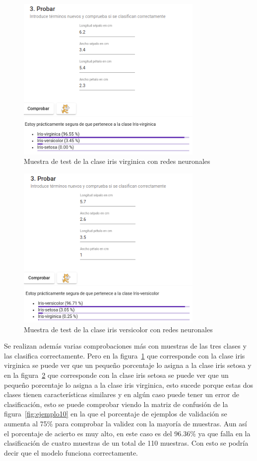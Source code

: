 \documentclass[a4paper, 12pt]{book}
\begin{document}
\begin{figure}
	\centering
	\includegraphics[width=9cm, keepaspectratio]{img/iris_vir_num_rn.png}
	\caption{Muestra de test de la clase iris virginica con redes neuronales} 	\label{fig:ejemplo8}
\end{figure}

\begin{figure}
	\centering
	\includegraphics[width=9cm, keepaspectratio]{img/iris_ver_num_rn.png}
	\caption{Muestra de test de la clase iris versicolor con redes neuronales} 	\label{fig:ejemplo9}
\end{figure}

Se realizan además varias comprobaciones más con muestras de las tres clases y las clasifica correctamente. Pero en la figura~\ref{fig:ejemplo8} que corresponde con la clase iris virginica se puede ver que un pequeño porcentaje lo asigna a la clase iris setosa y en la figura~\ref{fig:ejemplo9} que corresponde con la clase iris setosa se puede ver que un pequeño porcentaje lo asigna a la clase iris virginica, esto sucede porque estas dos clases tienen características similares y en algún caso puede tener un error de clasificación, esto se puede comprobar viendo la matriz de confusión de la figura~\ref{fig:ejemplo10} en la que el porcentaje de ejemplos de validación se aumenta al 75\% para comprobar la validez con la mayoría de muestras. 
Aun así el porcentaje de acierto es muy alto, en este caso es del 96.36\% ya que falla en la clasificación de cuatro muestras de un total de 110 muestras. Con esto se podría decir que el modelo funciona correctamente.
\end{document}
